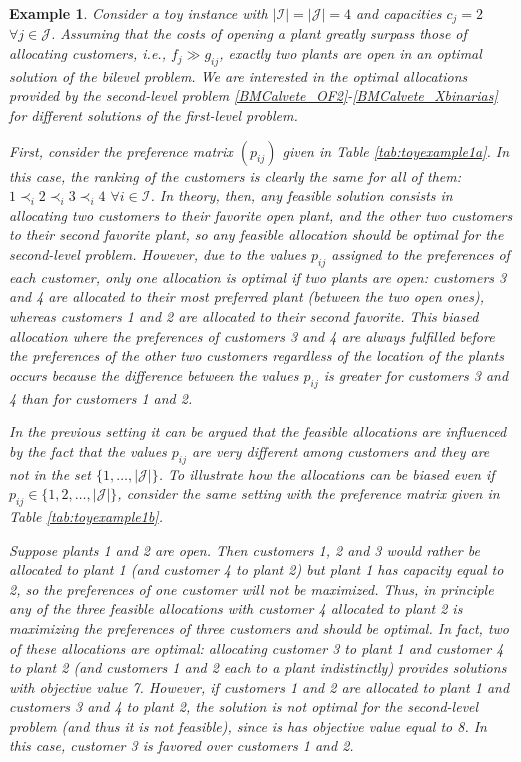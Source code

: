 \documentclass[preprint,11pt,authoryear]{elsarticle}
\def\J{\mathcal{J}}
\def\I{\mathcal{I}}
\newtheorem{example}{Example}
\begin{document}
\begin{example} \label{example1}
Consider a toy instance with $|\I|=|\J|=4$ and capacities $c_j=2$ $\forall j\in \J$. Assuming that the costs of opening a plant greatly surpass those of allocating customers, i.e., $f_j \gg g_{ij}$, exactly two plants are open in an optimal solution of the bilevel problem. We are interested in the optimal allocations provided by the second-level problem \eqref{BMCalvete_OF2}-\eqref{BMCalvete_Xbinarias} for different solutions of the first-level problem.

First, consider the preference matrix $(p_{ij})$ given in Table \ref{tab:toyexample1a}. In this case, the ranking of the customers is clearly the same for all of them: $1 \prec_i 2 \prec_i 3 \prec_i 4$ $\forall i\in \I$. In theory, then, any feasible solution consists in allocating two customers to their favorite open plant, and the other two customers to their second favorite plant, so \textit{any} feasible allocation should be optimal for the second-level problem. However, due to the values $p_{ij}$ assigned to the preferences of each customer, only one allocation is optimal if two plants are open: customers 3 and 4 are allocated to their most preferred plant (between the two open ones), whereas customers 1 and 2 are allocated to their second favorite. This biased allocation where the preferences of customers 3 and 4 are \textit{always} fulfilled before the preferences of the other two customers regardless of the location of the plants occurs because the difference between the values $p_{ij}$ is greater for customers 3 and 4 than for customers 1 and 2.

In the previous setting it can be argued that the feasible allocations are influenced by the fact that the values $p_{ij}$ are very different among customers and they are not in the set $\{1,\dots,|\J|\}$. To illustrate how the allocations can be biased even if $p_{ij} \in \{1,2,\dots,|\J|\}$, consider the same setting with the preference matrix given in Table \ref{tab:toyexample1b}. 

Suppose plants 1 and 2 are open. Then customers 1, 2 and 3 would rather be allocated to plant 1 (and customer 4 to plant 2) but plant 1 has capacity equal to 2, so the preferences of one customer will not be maximized. Thus, in principle any of the three feasible allocations with customer 4 allocated to plant 2 is maximizing the preferences of three customers and should be optimal. In fact, two of these allocations are optimal: allocating customer 3 to plant 1 and customer 4 to plant 2 (and customers 1 and 2 each to a plant indistinctly) provides solutions with objective value 7.   However, if customers 1 and 2 are allocated to plant 1 and customers 3 and 4 to plant 2, the solution is not optimal for the second-level problem (and thus it is not feasible), since is has objective value equal to 8. In this case, customer 3 is favored over customers 1 and 2.


\end{example}
\end{document}
